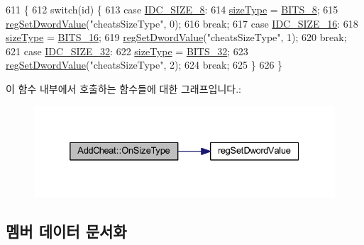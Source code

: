 \begin{DoxyCode}
611 \{
612   \textcolor{keywordflow}{switch}(\textcolor{keywordtype}{id}) \{
613   \textcolor{keywordflow}{case} \mbox{\hyperlink{resource_8h_aabec7e8ec4648288db9ff8c10fdf3bb7}{IDC\_SIZE\_8}}:
614     \mbox{\hyperlink{class_add_cheat_a7c3af367e51b1812d951dd2d24ac1aa8}{sizeType}} = \mbox{\hyperlink{_cheat_search_8h_adf764cbdea00d65edcd07bb9953ad2b7af0816abbef0501e93cc698ee906d1fcc}{BITS\_8}};
615     \mbox{\hyperlink{_reg_8cpp_a758e775489a3fb5c3cc7071fdd5af87e}{regSetDwordValue}}(\textcolor{stringliteral}{"cheatsSizeType"}, 0);
616     \textcolor{keywordflow}{break};
617   \textcolor{keywordflow}{case} \mbox{\hyperlink{resource_8h_a3b1ce25b145995e8af592b0a80b8e564}{IDC\_SIZE\_16}}:
618     \mbox{\hyperlink{class_add_cheat_a7c3af367e51b1812d951dd2d24ac1aa8}{sizeType}} = \mbox{\hyperlink{_cheat_search_8h_adf764cbdea00d65edcd07bb9953ad2b7abb0eee326b181eb02d5c284fc424ffeb}{BITS\_16}};
619     \mbox{\hyperlink{_reg_8cpp_a758e775489a3fb5c3cc7071fdd5af87e}{regSetDwordValue}}(\textcolor{stringliteral}{"cheatsSizeType"}, 1);
620     \textcolor{keywordflow}{break};
621   \textcolor{keywordflow}{case} \mbox{\hyperlink{resource_8h_a2d7fa8cb0d3104b26a76be5ab586ff5a}{IDC\_SIZE\_32}}:
622     \mbox{\hyperlink{class_add_cheat_a7c3af367e51b1812d951dd2d24ac1aa8}{sizeType}} = \mbox{\hyperlink{_cheat_search_8h_adf764cbdea00d65edcd07bb9953ad2b7aa9302713d54f2f027fa92a747c80c91a}{BITS\_32}};
623     \mbox{\hyperlink{_reg_8cpp_a758e775489a3fb5c3cc7071fdd5af87e}{regSetDwordValue}}(\textcolor{stringliteral}{"cheatsSizeType"}, 2);
624     \textcolor{keywordflow}{break};
625   \}
626 \}
\end{DoxyCode}
이 함수 내부에서 호출하는 함수들에 대한 그래프입니다.\+:
\nopagebreak
\begin{figure}[H]
\begin{center}
\leavevmode
\includegraphics[width=332pt]{class_add_cheat_ae9762fec683ccd9972d29fec47eecba4_cgraph}
\end{center}
\end{figure}


\subsection{멤버 데이터 문서화}
\mbox{\label{class_add_cheat_ae21ae20b0a2e3b936b9ecbacb13a2751}} 
